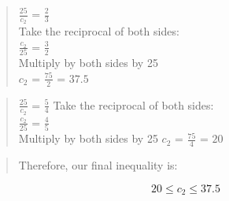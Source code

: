 \documentclass[]{article}
\begin{document}
\begin{quote}
\(\frac{25}{c_2}\) = \(\frac{2}{3}\)\\
Take the reciprocal of both sides:\\
\(\frac{c_2}{25}\) = \(\frac{3}{2}\)\\
Multiply by both sides by 25\\
\(c_2\) = \(\frac{75}{2}\) = \(37.5\)
\end{quote}

\begin{quote}
\(\frac{25}{c_2}\) = \(\frac{5}{4}\) Take the reciprocal of both
sides:\\
\(\frac{c_2}{25}\) = \(\frac{4}{5}\)\\
Multiply by both sides by 25 \(c_2\) = \(\frac{75}{4}\) = \(20\)
\end{quote}

\begin{quote}
Therefore, our final inequality is:
\end{quote}

\[20 \leq c_2 \leq 37.5\]
\end{document}
